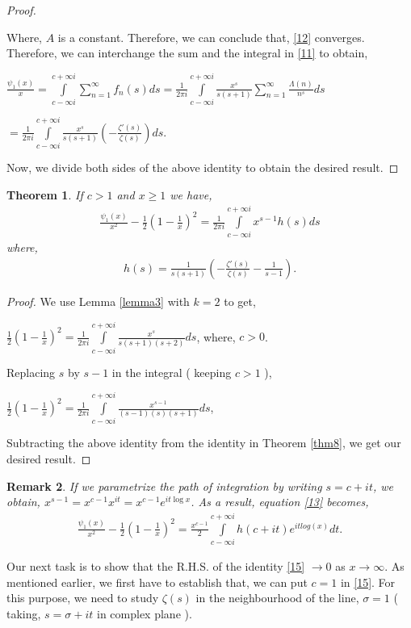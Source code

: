 \documentclass[article,12pt]{elsarticle}
\newtheorem{thm}{Theorem}[section]
\newtheorem{rmk}[thm]{Remark}
\begin{document}
\begin{proof}
\begin{center}
		\end{center}	
		Where, $A$ is a constant. Therefore, we can conclude that, \eqref{12} converges. Therefore, we can interchange the sum and the integral in \eqref{11} to obtain,
		\begin{center}
			$\frac{\psi_{1}(x)}{x}=\int\limits_{c-\infty i}^{c+\infty i}\sum\limits_{n=1}^{\infty}f_{n}(s)ds=\frac{1}{2\pi i}\int\limits_{c-\infty i}^{c+\infty i}\frac{x^{s}}{s(s+1)}\sum\limits_{n=1}^{\infty}\frac{\Lambda(n)}{n^{s}}ds$
		\end{center}	
		\begin{center}
			$=\frac{1}{2\pi i}\int\limits_{c-\infty i}^{c+\infty i}\frac{x^{s}}{s(s+1)}\left( -\frac{\zeta'(s)}{\zeta(s)}\right)	ds$.
		\end{center}	
		Now, we divide both sides of the above identity to obtain the desired result.
	\end{proof}
	\begin{thm}\label{thm9}
		If $c>1$ and $x\geq 1$ we have,
		\begin{eqnarray}\label{13}
			\frac{\psi_{1}(x)}{x^{2}}-\frac{1}{2}\left(1-\frac{1}{x}\right)^{2}=\frac{1}{2\pi i}\int\limits_{c-\infty i}^{c+\infty i}x^{s-1}h(s)ds
		\end{eqnarray}
		where,
		\begin{eqnarray}\label{14}
			h(s)=\frac{1}{s(s+1)}\left(-\frac{\zeta'(s)}{\zeta(s)}-\frac{1}{s-1}\right).
		\end{eqnarray}
	\end{thm}
	\begin{proof}
		We use Lemma \eqref{lemma3} with $k=2$ to get,
		\begin{center}
			$\frac{1}{2}(1-\frac{1}{x})^{2}=\frac{1}{2\pi i}\int\limits_{c-\infty i}^{c+\infty i}\frac{x^{s}}{s(s+1)(s+2)}ds$,\hspace{20pt} where, $c>0$.
		\end{center}
		Replacing $s$ by $s-1$ in the integral ( keeping $c>1$ ),
		\begin{center}
			$\frac{1}{2}(1-\frac{1}{x})^{2}=\frac{1}{2\pi i}\int\limits_{c-\infty i}^{c+\infty i}\frac{x^{s-1}}{(s-1)(s)(s+1)}ds$,
		\end{center}
		Subtracting the above identity from the identity in Theorem \eqref{thm8}, we get our desired result.
	\end{proof}
	\begin{rmk}\label{rmk2}
		If we parametrize the path of integration by writing $s=c+it$, we obtain, $x^{s-1}=x^{c-1}x^{it}=x^{c-1}e^{it\log x}$. As a result, equation \eqref{13} becomes,
		\begin{eqnarray}\label{15}
			\frac{\psi_{1}(x)}{x^{2}}-\frac{1}{2}\left(1-\frac{1}{x}\right)^{2}=\frac{x^{c-1}}{2}\int\limits_{c-\infty i}^{c+\infty i}h(c+it)e^{itlog(x)}dt .
		\end{eqnarray}
	\end{rmk} 
	Our next task is to show that the R.H.S. of the identity \eqref{15} $\rightarrow 0$ as $x\rightarrow \infty$. As mentioned earlier, we first have to establish that, we can put $c=1$ in \eqref{15}. For this purpose, we need to study $\zeta(s)$ in the neighbourhood of the line, $\sigma =1$ ( taking, $s=\sigma + it$ in complex plane ).
\end{document}
